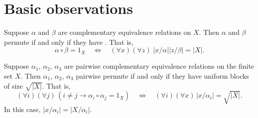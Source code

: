 \section{Basic observations}
\begin{lemma}
\label{lem:1}
Suppose $\alpha$ and $\beta$ are complementary equivalence relations on
$X$. Then $\alpha$ and $\beta$ permute if and only if they have \cubs.
That is,
\begin{equation}
  \label{eq:9}
\alpha \circ \beta =1_X \quad \Longleftrightarrow \quad (\forall x)(\forall z)\;
|x/\alpha| |z/\beta| = |X|.
\end{equation}
\end{lemma}
\begin{corollary}
\label{cor:1}
Suppose $\alpha_1$, $\alpha_2$, $\alpha_3$ are pairwise complementary
equivalence relations on the finite set $X$. 
Then  $\alpha_1$, $\alpha_2$, $\alpha_3$ pairwise permute if and only if they
have uniform blocks of size $\sqrt{|X|}$.  That is,
\[
(\forall i)(\forall j) \, (i\neq j \longrightarrow \alpha_i \circ \alpha_j = 1_X)
\quad \Longleftrightarrow \quad (\forall i)(\forall x) \, |x/\alpha_i| =
\sqrt{|X|}.
\]
In this case,  $|x/\alpha_i| = |X/\alpha_i|$. %
\end{corollary}
